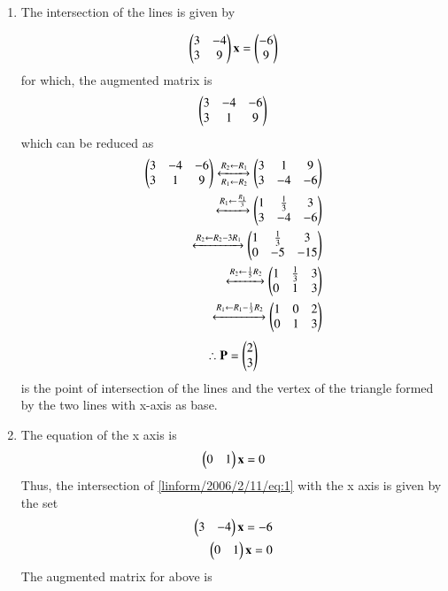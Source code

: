 
\begin{enumerate}
    \item The intersection of the lines is given by 
    
\begin{align}
    \begin{pmatrix}3 & -4 \\ 3 & 9\end{pmatrix}\mathbf{x}=
\begin{pmatrix}-6 \\ 9\end{pmatrix}
\end{align}
for which, the augmented matrix is
\begin{align}
    \begin{pmatrix}3 & -4 & -6\\
           3 & 1 & 9\end{pmatrix}
\end{align}
which  can be reduced as 
 \begin{align}
     \begin{pmatrix}3 & -4 & -6\\
           3 & 1 & 9\end{pmatrix}
    \xleftrightarrow[R_1 \leftarrow R_2]
    {R_2 \leftarrow R_1}
    \begin{pmatrix}3 & 1 & 9\\
          3 & -4 & -6\end{pmatrix}\\
          \xleftrightarrow{R_1 \leftarrow \frac{R_1}{3}}
    \begin{pmatrix}1 &\frac{1}{3}&3\\
        3&-4&-6\end{pmatrix}\\
        \xleftrightarrow{R_2\leftarrow R_2-3R_1}
    \begin{pmatrix}1&\frac{1}{3}&3\\0&-5&-15\end{pmatrix}\\
    \xleftrightarrow{R_2\leftarrow \frac{1}{5}R_2}
    \begin{pmatrix}1&\frac{1}{3}&3\\0&1&3\end{pmatrix}\\
    \xleftrightarrow{R_1\leftarrow R_1-\frac{1}{3}R_2}
    \begin{pmatrix}1&0&2\\0&1&3\end{pmatrix}
 \end{align}
\begin{align}
\therefore \mathbf{P}=\begin{pmatrix}2\\3\end{pmatrix}
\end{align}
is the point of intersection of the lines and the vertex of the triangle formed by the two lines with x-axis as base.
\item 
The     equation of the x axis is 
    \begin{align}
        \begin{pmatrix}0&1\end{pmatrix}\mathbf{x}=0
    \end{align}
    Thus, the intersection of \eqref{linform/2006/2/11/eq:1} with the x axis is given by the set
     \begin{align}
        \begin{pmatrix}3&-4\end{pmatrix}\mathbf{x}=-6\\
        \begin{pmatrix}0&1\end{pmatrix}\mathbf{x}=0
    \end{align}
    The augmented matrix for above is
\begin{align}

\end{align}
\end{enumerate}
